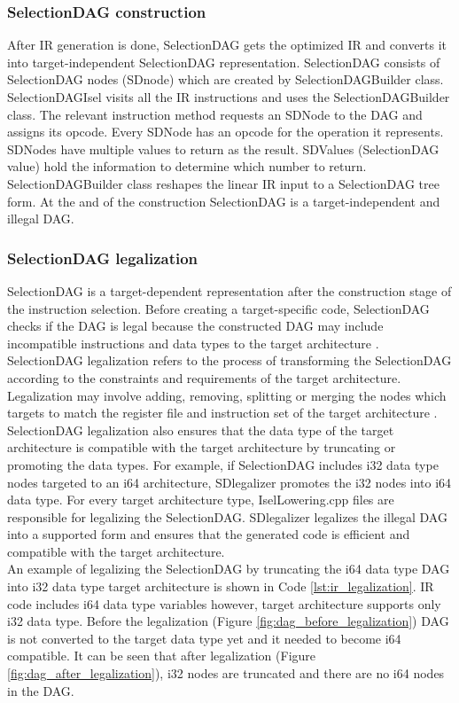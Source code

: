 \subsubsection{SelectionDAG construction}
After IR generation is done, SelectionDAG gets the optimized IR and converts it into target-independent SelectionDAG representation. SelectionDAG consists of SelectionDAG nodes (SDnode) which are created by SelectionDAGBuilder class. SelectionDAGIsel visits all the IR instructions and uses the SelectionDAGBuilder class. The relevant instruction method requests an SDNode to the DAG and assigns its opcode. Every SDNode has an opcode for the operation it represents. SDNodes have multiple values to return as the result. SDValues (SelectionDAG value) hold the information to determine which number to return. SelectionDAGBuilder class reshapes the linear IR input to a SelectionDAG tree form. At the and of the construction SelectionDAG is a target-independent and illegal DAG.

\subsubsection{SelectionDAG legalization}
SelectionDAG is a target-dependent representation after the construction stage of the instruction selection. Before creating a target-specific code, SelectionDAG checks if the DAG is legal because the constructed DAG may include incompatible instructions and data types to the target architecture \cite{legalizer}. SelectionDAG legalization refers to the process of transforming the SelectionDAG according to the constraints and requirements of the target architecture. Legalization may involve adding, removing, splitting or merging the nodes which targets to match the register file and instruction set of the target architecture \cite{llvmcookbook}. SelectionDAG legalization also ensures that the data type of the target architecture is compatible with the target architecture by truncating or promoting the data types. For example, if SelectionDAG includes i32 data type nodes targeted to an i64 architecture, SDlegalizer promotes the i32 nodes into i64 data type. For every target architecture type, IselLowering.cpp files are responsible for legalizing the SelectionDAG. SDlegalizer legalizes the illegal DAG into a supported form and ensures that the generated code is efficient and compatible with the target architecture.\\
An example of legalizing the SelectionDAG by truncating the i64 data type DAG into i32 data type target architecture is shown in Code \ref{lst:ir_legalization}. IR code includes i64 data type variables however, target architecture supports only i32 data type. Before the legalization (Figure \ref{fig:dag_before_legalization}) DAG is not converted to the target data type yet and it needed to become i64 compatible. It can be seen that after legalization (Figure \ref{fig:dag_after_legalization}), i32 nodes are truncated and there are no i64 nodes in the DAG.

